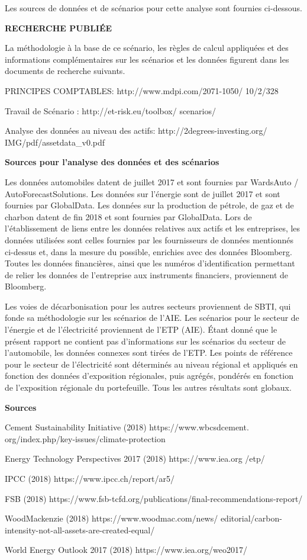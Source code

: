\documentclass[10pt,table,a4]{article}\usepackage[]{graphicx}\usepackage[]{color}
\begin{document}
	\begin{multicols}{2}
		{\small Les sources de données et de scénarios pour cette analyse sont fournies ci-dessous. 
		
		\textbf{RECHERCHE PUBLIÉE}
		
		La méthodologie à la base de ce scénario, les règles de calcul appliquées et des informations complémentaires sur les scénarios et les données figurent dans les documents de recherche suivants.
		
		PRINCIPES COMPTABLES: http://www.mdpi.com/2071-1050/ 10/2/328 
		
		Travail de Scénario : http://et-risk.eu/toolbox/ scenarios/ 
		
		Analyse des données au niveau des actifs: http://2degrees-investing.org/ IMG/pdf/assetdata\_v0.pdf
		
		\textbf{Sources pour l'analyse des données et des scénarios}
		
		Les données automobiles datent de juillet 2017 et sont fournies par WardsAuto / AutoForecastSolutions. Les données sur l'énergie sont de juillet 2017 et sont fournies par GlobalData. Les données sur la production de pétrole, de gaz et de charbon datent de fin 2018 et sont fournies par GlobalData. Lors de l'établissement de liens entre les données relatives aux actifs et les entreprises, les données utilisées sont celles fournies par les fournisseurs de données mentionnés ci-dessus et, dans la mesure du possible, enrichies avec des données Bloomberg. Toutes les données financières, ainsi que les numéros d'identification permettant de relier les données de l'entreprise aux instruments financiers, proviennent de Bloomberg. 
		
		Les voies de décarbonisation pour les autres secteurs proviennent de SBTI, qui fonde sa méthodologie sur les scénarios de l'AIE. Les scénarios pour le secteur de l'énergie et de l'électricité proviennent de l'ETP (AIE). Étant donné que le présent rapport ne contient pas d'informations sur les scénarios du secteur de l'automobile, les données connexes sont tirées de l'ETP. Les points de référence pour le secteur de l'électricité sont déterminés au niveau régional et appliqués en fonction des données d'exposition régionales, puis agrégés, pondérés en fonction de l'exposition régionale du portefeuille. Tous les autres résultats sont globaux.
		
		
		\textbf{Sources}
		
		Cement Sustainability Initiative (2018) https://www.wbcsdcement. org/index.php/key-issues/climate-protection
		
		Energy Technology Perspectives 2017 (2018) https://www.iea.org /etp/
		
		IPCC (2018) https://www.ipcc.ch/report/ar5/
		
		FSB (2018) https://www.fsb-tcfd.org/publications/final-recommendations-report/
		
		WoodMackenzie (2018) https://www.woodmac.com/news/ editorial/carbon-intensity-not-all-assets-are-created-equal/ 
		
		World Energy Outlook 2017 (2018) https://www.iea.org/weo2017/}
	
	\end{multicols}
	
	\newpage
	\newpage 
\end{document}
